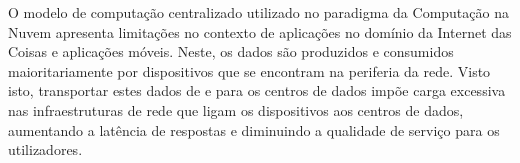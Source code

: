 


O modelo de computação centralizado utilizado no paradigma da Computação na Nuvem apresenta limitações no contexto de aplicações no domínio da Internet das Coisas e aplicações móveis. Neste, os dados são produzidos e consumidos maioritariamente por dispositivos que se encontram na periferia da rede. Visto isto, transportar estes dados de e para os centros de dados impõe carga excessiva nas infraestruturas de rede que ligam os dispositivos aos centros de dados, aumentando a latência de respostas e diminuindo a qualidade de serviço para os utilizadores. 

